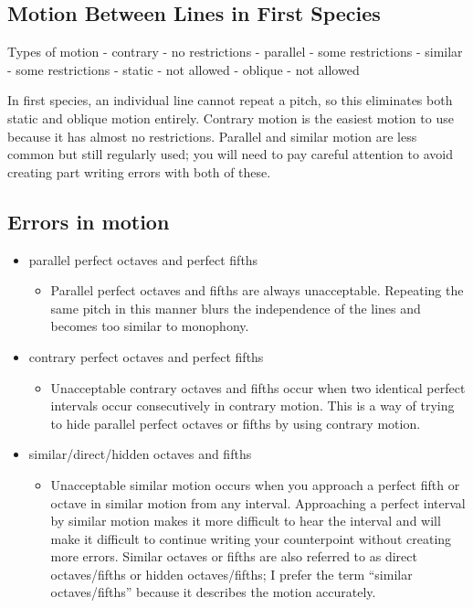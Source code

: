 \documentclass{book}
\providecommand{\tightlist}{%
  \setlength{\itemsep}{0pt}\setlength{\parskip}{0pt}}
\begin{document}
\hypertarget{motion-between-lines-in-first-species}{%
\subsection{Motion Between Lines in First
Species}\label{motion-between-lines-in-first-species}}

Types of motion - contrary - no restrictions - parallel - some restrictions -
similar - some restrictions - static - not allowed - oblique - not allowed

In first species, an individual line cannot repeat a pitch, so this eliminates
both static and oblique motion entirely. Contrary motion is the easiest motion
to use because it has almost no restrictions. Parallel and similar motion are
less common but still regularly used; you will need to pay careful attention
to avoid creating part writing errors with both of these.

\hypertarget{errors-in-motion}{%
\subsection{Errors in motion}\label{errors-in-motion}}

\begin{itemize}
\tightlist
\item
  parallel perfect octaves and perfect fifths

  \begin{itemize}
  \tightlist
  \item
    Parallel perfect octaves and fifths are always unacceptable. Repeating the
    same pitch in this manner blurs the independence of the lines and becomes
    too similar to monophony.
  \end{itemize}
\item
  contrary perfect octaves and perfect fifths

  \begin{itemize}
  \tightlist
  \item
    Unacceptable contrary octaves and fifths occur when two identical perfect
    intervals occur consecutively in contrary motion. This is a way of trying
    to hide parallel perfect octaves or fifths by using contrary motion.
  \end{itemize}
\item
  similar/direct/hidden octaves and fifths

  \begin{itemize}
  \tightlist
  \item
    Unacceptable similar motion occurs when you approach a perfect fifth or
    octave in similar motion from any interval. Approaching a perfect interval
    by similar motion makes it more difficult to hear the interval and will
    make it difficult to continue writing your counterpoint without creating
    more errors. Similar octaves or fifths are also referred to as direct
    octaves/fifths or hidden octaves/fifths; I prefer the term ``similar
    octaves/fifths'' because it describes the motion accurately.
  \end{itemize}
\end{itemize}
\end{document}

